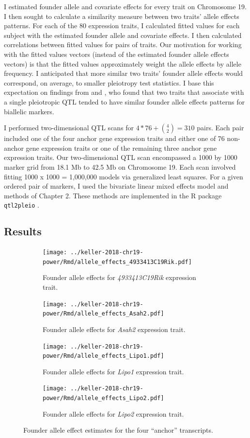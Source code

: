 \documentclass[oneside]{book}\usepackage[]{graphicx}\usepackage[]{color}
\begin{document}
I estimated founder allele and covariate effects for every trait on Chromosome 19. I then 
sought to calculate a similarity measure between two traits' allele effects patterns. 
For each of the 80 expression traits, I calculated fitted values for each subject with the 
estimated founder allele and covariate effects. 
I then calculated correlations between fitted values for pairs of traits. 
Our motivation for working with the fitted values vectors 
(instead of the estimated founder allele effects vectors) is that the fitted values 
approximately weight the allele effects by allele frequency. 
I anticipated that more similar two traits' founder allele effects would correspond, on 
average, to smaller pleiotropy test statistics. 
I base this expectation on findings from \citet{macdonald2007joint} and 
\citet{king2012genetic}, who found that two traits that associate with a single 
pleiotropic QTL tended to have similar founder allele effects patterns for biallelic 
markers. 


I performed two-dimensional QTL scans for $4 * 76 + \binom{4}{2} = 310$ pairs. 
Each pair included one of the four anchor gene expression traits and 
either one of 76 non-anchor gene expression traits or one of 
the remaining three anchor gene expression traits.
Our two-dimensional QTL scan encompassed a 1000 by 1000 marker grid from 18.1 Mb to 42.5 Mb 
on Chromosome 19. 
Each scan involved fitting 1000 x 1000 = 1,000,000 models via generalized least squares. 
For a given ordered pair of markers, I used the bivariate linear mixed effects model and 
methods of Chapter 2. 
These methods are implemented in the R package \texttt{qtl2pleio} \citep{qtl2pleio}.



\subsection{Results}

\begin{figure}
\centering
\begin{subfigure}[t]{0.45\textwidth}
\texttt{[image: ../keller-2018-chr19-power/Rmd/allele\_effects\_4933413C19Rik.pdf]}
\caption{Founder allele effects for \emph{4933413C19Rik} expression trait.}
\end{subfigure}
\begin{subfigure}[t]{0.45\textwidth}
\texttt{[image: ../keller-2018-chr19-power/Rmd/allele\_effects\_Asah2.pdf]}
\caption{Founder allele effects for \emph{Asah2} expression trait.}
\end{subfigure}
\begin{subfigure}[t]{0.45\textwidth}
\texttt{[image: ../keller-2018-chr19-power/Rmd/allele\_effects\_Lipo1.pdf]}
\caption{Founder allele effects for \emph{Lipo1} expression trait.}
\end{subfigure}
\begin{subfigure}[t]{0.45\textwidth}
\texttt{[image: ../keller-2018-chr19-power/Rmd/allele\_effects\_Lipo2.pdf]}
\caption{Founder allele effects for \emph{Lipo2} expression trait.}
\end{subfigure}
\caption{Founder allele effect estimates for the four ``anchor'' transcripts.}\label{fig:anchor-effects}
\end{figure}
\end{document}
